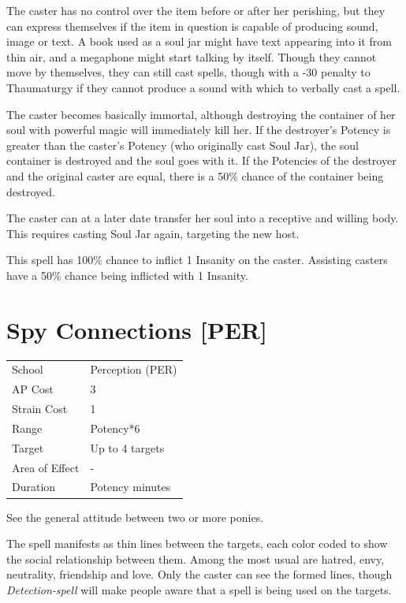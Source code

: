 \documentclass[11pt,a4paper,twocolumn]{book}
\begin{document}
The caster has no control over the item before or after her perishing, but they can express themselves if the item in question is capable of producing sound, image or text. A book used as a soul jar might have text appearing into it from thin air, and a megaphone might start talking by itself. Though they cannot move by themselves, they can still cast spells, though with a -30 penalty to Thaumaturgy if they cannot produce a sound with which to verbally cast a spell.

The caster becomes basically immortal, although destroying the container of her soul with powerful magic will immediately kill her. If the destroyer's Potency is greater than the caster's Potency (who originally cast Soul Jar), the soul container is destroyed and the soul goes with it. If the Potencies of the destroyer and the original caster are equal, there is a 50\% chance of the container being destroyed.

The caster can at a later date transfer her soul into a receptive and willing body. This requires casting Soul Jar again, targeting the new host.

This spell has 100\% chance to inflict 1 Insanity on the caster. Assisting casters have a 50\% chance being inflicted with 1 Insanity.


\section*{Spy Connections [PER]}
{
	\begin{tabu} to 75mm{| X[l,4] | X[l,7] |}
		\hline
		School 			& Perception (PER) 		\\
        AP Cost	      	& 3 					\\
        Strain Cost     & 1 					\\
        Range     		& Potency*6 			\\
        Target      	& Up to 4 targets		\\
        Area of Effect  & - 	 				\\
        Duration     	& Potency minutes		\\ \hline
	\end{tabu}
		
}

\medskip

See the general attitude between two or more ponies.

The spell manifests as thin lines between the targets, each color coded to show the social relationship between them. Among the most usual are hatred, envy, neutrality, friendship and love. Only the caster can see the formed lines, though \textit{Detection-spell} will make people aware that a spell is being used on the targets.
\end{document}
